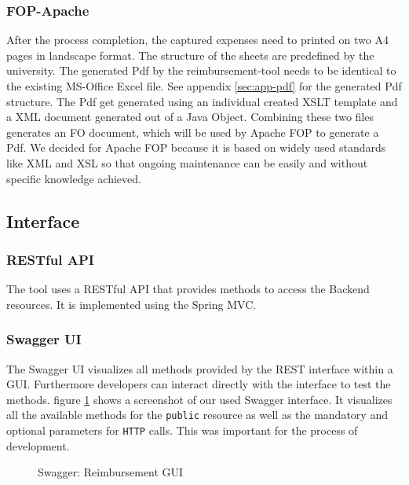 \subsubsection{FOP-Apache}
After the process completion, the captured expenses need to printed on two A4 pages in landscape format. The structure of the sheets are predefined by the university. The generated Pdf by the reimbursement-tool needs to be identical to the existing MS-Office Excel file. See appendix \ref{sec:app-pdf} for the generated Pdf structure.\newline
The Pdf get generated using an individual created XSLT template and a XML document generated out of a Java Object. Combining these two files generates an FO document, which will be used by Apache FOP \cite{apache-fop} to generate a Pdf.\newline
We decided for Apache FOP because it is based on widely used standards like XML and XSL so that ongoing maintenance can be easily and without specific knowledge achieved.

\subsection{Interface}

\subsubsection{RESTful API}
\label{sec:restfulapi}
The tool uses a RESTful API that provides methods to access the Backend resources. It is implemented using the Spring MVC. 

\subsubsection{Swagger UI}
The Swagger UI visualizes all methods provided by the REST interface within a GUI. Furthermore developers can interact directly with the interface to test the methods. figure \ref{fig:swagger01} shows a screenshot of our used Swagger interface. It visualizes all the available methods for the \texttt{public} resource as well as the mandatory and optional parameters for \texttt{HTTP} calls. This was important for the process of development. \cite{swagger}

\begin{figure}[H]
    \centering
    \caption{Swagger: Reimbursement GUI}
    \label{fig:swagger01}
\end{figure}

